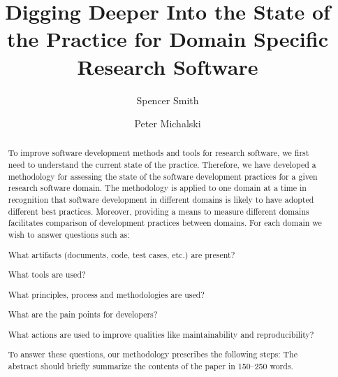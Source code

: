 \documentclass[runningheads]{llncs}
\begin{document}
%
\title{Digging Deeper Into the State of the Practice for Domain Specific Research Software}
%
\author{Spencer Smith \and
Peter Michalski}%
%
%
%
\maketitle              %
%
\begin{abstract}

	To improve software development methods and tools for research software, we
	first need to understand the current state of the practice.  Therefore, we
	have developed a methodology for assessing the state of the software
	development practices for a given research software domain.  The methodology
	is applied to one domain at a time in recognition that software development in
	different domains is likely to have adopted different best practices.
	Moreover, providing a means to measure different domains facilitates
	comparison of development practices between domains.  For each domain we wish
	to answer questions such as: 
  \begin{inparaenum}[i)]
    \item What artifacts (documents, code, test cases, etc.) are present?
    \item What tools are used?
    \item What principles, process and methodologies are used?
    \item What are the pain points for developers?
    \item What actions are used to improve qualities like maintainability and
    reproducibility?
  \end{inparaenum} 
  To answer these questions, our methodology prescribes the following steps: 
  The abstract should briefly summarize the contents of the paper in 150--250 words.

\end{abstract}
\end{document}
